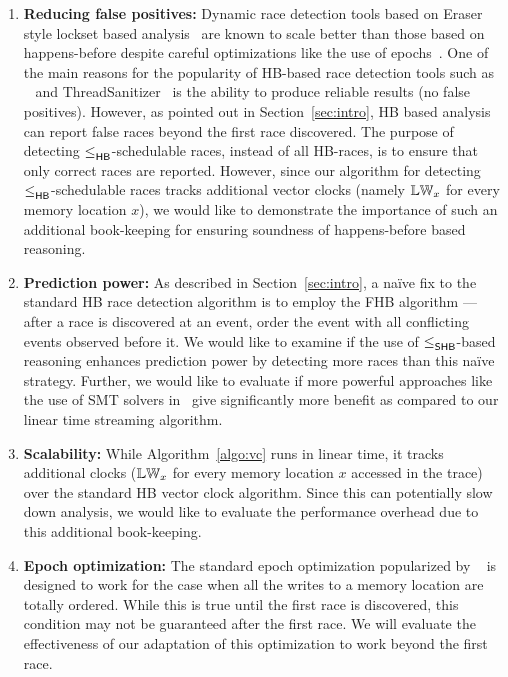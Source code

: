 \begin{enumerate}
  \item \textbf{Reducing false positives:} Dynamic race detection
  tools based on Eraser style lockset based
  analysis~\cite{savage1997eraser} are known to scale better than
  those based on happens-before despite careful optimizations like the
  use of epochs~\cite{fasttrack}.  One of the main reasons for the
  popularity of HB-based race detection tools such
  as \fasttrack~\cite{fasttrack} and
  ThreadSanitizer~\cite{threadsanitizer} is the ability to produce
  reliable results (no false positives).  However, as pointed out in
  Section~\ref{sec:intro}, HB based analysis can report false races
  beyond the first race discovered.  The purpose of detecting
  $\leq^{}_{\mathsf{HB}}$-schedulable races, instead of all HB-races, is to ensure
  that only correct races are reported.  However, since our algorithm
  for detecting $\leq^{}_{\mathsf{HB}}$-schedulable races tracks additional vector
  clocks (namely $\mathbb{LW}_x$ for every memory location $x$), we would like
  to demonstrate the importance of such an additional book-keeping for
  ensuring soundness of happens-before based reasoning.

  \item \textbf{Prediction power:} As described in
  Section~\ref{sec:intro}, a na\"ive fix to the standard HB race
  detection algorithm is to employ the FHB algorithm --- after a race
  is discovered at an event, order the event with all conflicting
  events observed before it.  We would like to examine if the use of
  $\leq^{}_{\mathsf{SHB}}$-based reasoning enhances prediction power by detecting more
  races than this na\"ive strategy.  Further, we would like to
  evaluate if more powerful approaches like the use of SMT solvers
  in \rvpredict~give significantly more benefit as compared to our
  linear time streaming algorithm.

  \item \textbf{Scalability:} While Algorithm~\ref{algo:vc} runs in
  linear time, it tracks additional clocks ($\mathbb{LW}_x$ for every memory
  location $x$ accessed in the trace) over the standard HB vector
  clock algorithm.  Since this can potentially slow down analysis, we
  would like to evaluate the performance overhead due to this
  additional book-keeping.

  \item \textbf{Epoch optimization:} The standard epoch optimization
  popularized by \fasttrack~\cite{fasttrack} is designed to work for
  the case when all the writes to a memory location are totally
  ordered.  While this is true until the first race is discovered,
  this condition may not be guaranteed after the first race.  We will
  evaluate the effectiveness of our adaptation of this optimization to
  work beyond the first race.
\end{enumerate}

